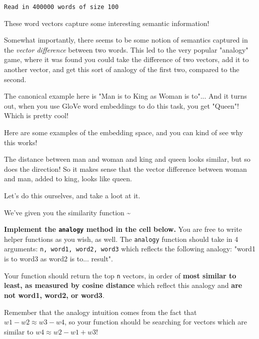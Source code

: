 \documentclass[11pt]{article}
\begin{document}
    \begin{Verbatim}[commandchars=\\\{\}]
Read in 400000 words of size 100

    \end{Verbatim}

    These word vectors capture some interesting semantic information!

Somewhat importantly, there seems to be some notion of semantics
captured in the \emph{vector difference} between two words. This led to
the very popular "analogy" game, where it was found you could take the
difference of two vectors, add it to another vector, and get this sort
of analogy of the first two, compared to the second.

The canonical example here is "Man is to King as Woman is to"... And it
turns out, when you use GloVe word embeddings to do this task, you get
"Queen"! Which is pretty cool!

Here are some examples of the embedding space, and you can kind of see
why this works!

The distance between man and woman and king and queen looks similar, but
so does the direction! So it makes sense that the vector difference
between woman and man, added to king, looks like queen.

Let's do this ourselves, and take a loot at it.

We've given you the similarity function \textasciitilde{}

\textbf{Implement the \texttt{analogy} method in the cell below.} You
are free to write helper functions as you wish, as well. The
\texttt{analogy} function should take in 4 arguments:
\texttt{n,\ word1,\ word2,\ word3} which reflects the following analogy:
"word1 is to word3 as word2 is to... result".

Your function should return the top \texttt{n} vectors, in order of
\textbf{most similar to least, as measured by cosine distance} which
reflect this analogy and \textbf{are not word1, word2, or word3}.

Remember that the analogy intuition comes from the fact that
\(w1 - w2 \approx w3 - w4\), so your function should be searching for
vectors which are similar to \(w4 \approx w2 - w1 + w3\)!
\end{document}
